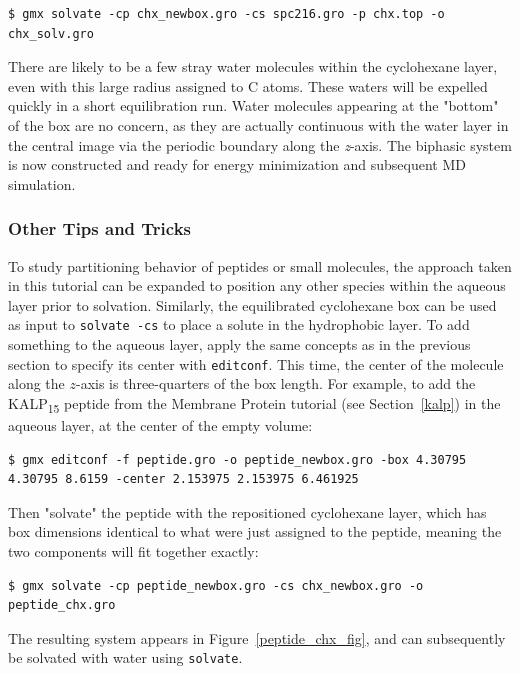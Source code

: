 \documentclass[9pt,tutorial,pubversion]{livecoms}
\begin{document}
\begin{lstlisting}
$ gmx solvate -cp chx_newbox.gro -cs spc216.gro -p chx.top -o chx_solv.gro
\end{lstlisting}

There are likely to be a few stray water molecules within the cyclohexane layer, even with this large radius assigned to C atoms. These waters will be expelled quickly in a short equilibration run. Water molecules appearing at the "bottom" of the box are no concern, as they are actually continuous with the water layer in the central image via the periodic boundary along the {\em z}-axis. The biphasic system is now constructed and ready for energy minimization and subsequent MD simulation.

\subsubsection{Other Tips and Tricks} \label{biphasic_tips_tricks}

To study partitioning behavior of peptides or small molecules, the approach taken in this tutorial can be expanded to position any other species within the aqueous layer prior to solvation. Similarly, the equilibrated cyclohexane box can be used as input to \texttt{solvate -cs} to place a solute in the hydrophobic layer. To add something to the aqueous layer, apply the same concepts as in the previous section to specify its center with \texttt{editconf}. This time, the center of the molecule along the $z$-axis is three-quarters of the box length. For example, to add the KALP\textsubscript{15} peptide from the Membrane Protein tutorial (see Section~\ref{kalp}) in the aqueous layer, at the center of the empty volume:

\begin{lstlisting}
$ gmx editconf -f peptide.gro -o peptide_newbox.gro -box 4.30795 4.30795 8.6159 -center 2.153975 2.153975 6.461925
\end{lstlisting}

Then "solvate" the peptide with the repositioned cyclohexane layer, which has box dimensions identical to what were just assigned to the peptide, meaning the two components will fit together exactly:

\begin{lstlisting}
$ gmx solvate -cp peptide_newbox.gro -cs chx_newbox.gro -o peptide_chx.gro
\end{lstlisting}

The resulting system appears in Figure~\ref{peptide_chx_fig}, and can subsequently be solvated with water using \texttt{solvate}.
\end{document}
